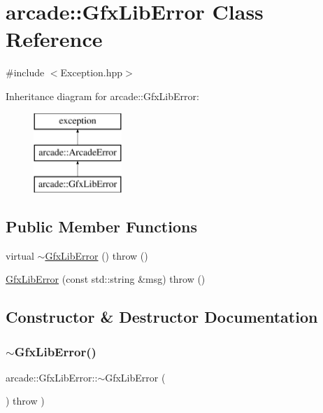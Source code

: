 \hypertarget{classarcade_1_1_gfx_lib_error}{}\section{arcade\+:\+:Gfx\+Lib\+Error Class Reference}
\label{classarcade_1_1_gfx_lib_error}


{\ttfamily \#include $<$Exception.\+hpp$>$}

Inheritance diagram for arcade\+:\+:Gfx\+Lib\+Error\+:\begin{figure}[H]
\begin{center}
\leavevmode
\includegraphics[height=3.000000cm]{classarcade_1_1_gfx_lib_error}
\end{center}
\end{figure}
\subsection*{Public Member Functions}
\begin{DoxyCompactItemize}
\item 
virtual \hyperlink{classarcade_1_1_gfx_lib_error_a8ca4f3f6dd5896c71838b770c4a95200}{$\sim$\+Gfx\+Lib\+Error} ()  throw ()
\item 
\hyperlink{classarcade_1_1_gfx_lib_error_a4a74810744427eecd13717581ae29cda}{Gfx\+Lib\+Error} (const std\+::string \&msg)  throw ()
\end{DoxyCompactItemize}


\subsection{Constructor \& Destructor Documentation}
\mbox{\label{classarcade_1_1_gfx_lib_error_a8ca4f3f6dd5896c71838b770c4a95200}} 
\subsubsection{\texorpdfstring{$\sim$\+Gfx\+Lib\+Error()}{~GfxLibError()}}
{\footnotesize\ttfamily arcade\+::\+Gfx\+Lib\+Error\+::$\sim$\+Gfx\+Lib\+Error (\begin{DoxyParamCaption}{ }\end{DoxyParamCaption}) throw  ) \hspace{0.3cm}{\ttfamily [virtual]}}

